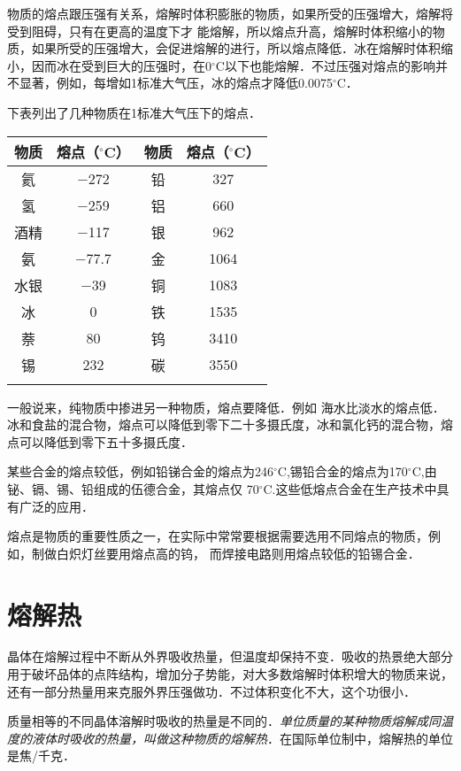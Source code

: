 物质的熔点跟压强有关系，熔解时体积膨胀的物质，如果所受的压强增大，熔解将受到阻碍，只有在更高的温度下才
能熔解，所以熔点升高，熔解时体积缩小的物质，如果所受的压强增大，会促进熔解的进行，所以熔点降低．冰在熔解时体积缩小，因而冰在受到巨大的压强时，在0$^\circ$C以下也能熔解．不过压强对熔点的影响并不显著，例如，每增如1标准大气压，冰的熔点才降低0.0075$^\circ$C．

下表列出了几种物质在1标准大气压下的熔点．

\begin{center}
    \begin{tabular}{cccc}
\hline
物质 & 熔点（$^\circ$C） & 物质 & 熔点（$^\circ$C） \\
\hline
氦 & $-$272 & 铅 & 327\\
氢& $-$259 & 铝 & 660\\
酒精& $-$117 & 银 & 962\\
氨& $-$77.7 & 金 & 1064\\
水银& $-$39 & 铜 & 1083\\
冰& 0 & 铁 & 1535\\
萘&80 & 钨 & 3410\\
锡&232   & 碳 & 3550\\
\hline
  &  \end{tabular}
\end{center}

一般说来，纯物质中掺进另一种物质，熔点要降低．例如
海水比淡水的熔点低．冰和食盐的混合物，熔点可以降低到零下二十多摄氏度，冰和氯化钙的混合物，熔点可以降低到零下五十多摄氏度．

某些合金的熔点较低，例如铅锑合金的熔点为246$^\circ$C,锡铅合金的熔点为170$^\circ$C,由铋、镉、锡、铅组成的伍德合金，其熔点仅 70$^\circ$C.这些低熔点合金在生产技术中具有广泛的应用．

熔点是物质的重要性质之一，在实际中常常要根据需要选用不同熔点的物质，例如，制做白炽灯丝要用熔点高的钨，
而焊接电路则用熔点较低的铅锡合金．

\section{熔解热}
晶体在熔解过程中不断从外界吸收热量，但温度却保持不变．吸收的热景绝大部分用于破坏品体的点阵结构，增加分子势能，对大多数熔解时体积增大的物质来说，还有一部分热量用来克服外界压强做功．不过体积变化不大，这个功很小．

质量相等的不同晶体溶解时吸收的热量是不同的．\textit{单位质量的某种物质熔解成同温度的液体时吸收的热量，叫做这种物质的熔解热}．在国际单位制中，熔解热的单位是焦/千克．


